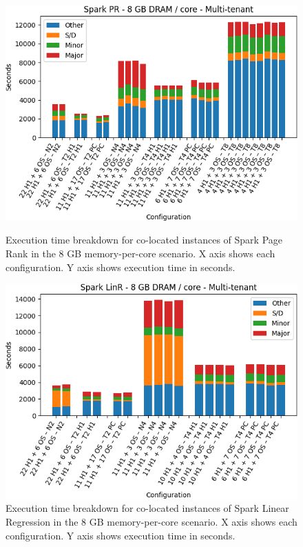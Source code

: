 \begin{figure}[thbp]
\centering
    \includegraphics[width=\linewidth]{./fig/pr64.png}
    \caption{Execution time breakdown for co-located instances of Spark
    Page Rank in the 8 GB memory-per-core scenario. X axis shows each configuration.
	Y axis shows execution time in seconds.}
    \label{fig:pr64}
	\includegraphics[width=\linewidth]{./fig/linr64.png}
    \caption{Execution time breakdown for co-located instances of Spark
    Linear Regression in the 8 GB memory-per-core scenario. X axis shows each configuration.
	Y axis shows execution time in seconds.}
    \label{fig:linr64}
\end{figure}

